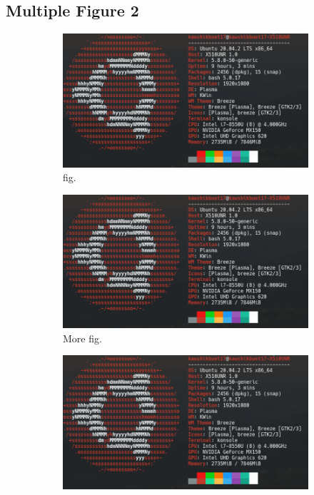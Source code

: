 \documentclass[14pt, a4paper]{article} %
\begin{document}
    \subsection{Multiple Figure 2}
        \begin{figure}[h!]
            \centering
            \begin{subfigure}[b]{0.2\linewidth}
                \includegraphics[width=\linewidth]{figure1.jpg}
                \caption{fig.}
            \end{subfigure}
            \begin{subfigure}[b]{0.2\linewidth}
                \includegraphics[width=\linewidth]{figure1.jpg}
                \caption{More fig.}
            \end{subfigure}
            \begin{subfigure}[b]{0.2\linewidth}
                \includegraphics[width=\linewidth]{figure1.jpg}

\end{subfigure}
\end{figure}
\end{document}
